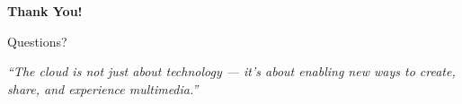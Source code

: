 \documentclass[aspectratio=169,12pt]{beamer}
\begin{document}
\begin{frame}
    \begin{center}
        \Huge{\textbf{Thank You!}}
        
        \vspace{1cm}
        \Large{Questions?}
        
        \vspace{1.5cm}
        \normalsize
        \textit{``The cloud is not just about technology --- it's about enabling new ways to create, share, and experience multimedia.''}
    \end{center}
\end{frame}
\end{document}
